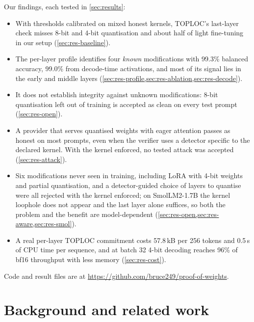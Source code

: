 \documentclass[11pt]{article}
\begin{document}
Our findings, each tested in \cref{sec:results}:
\begin{itemize}
  \item With thresholds calibrated on mixed honest kernels, TOPLOC's last-layer check misses 8-bit and 4-bit quantisation and about half of light fine-tuning in our setup (\cref{sec:res-baseline}).
  \item The per-layer profile identifies four \emph{known} modifications with 99.3\% balanced accuracy, 99.0\% from decode-time activations, and most of its signal lies in the early and middle layers (\cref{sec:res-profile,sec:res-ablation,sec:res-decode}).
  \item It does not establish integrity against unknown modifications: 8-bit quantisation left out of training is accepted as clean on every test prompt (\cref{sec:res-open}).
  \item A provider that serves quantised weights with eager attention passes as honest on most prompts, even when the verifier uses a detector specific to the declared kernel. With the kernel enforced, no tested attack was accepted (\cref{sec:res-attack}).
  \item Six modifications never seen in training, including LoRA with 4-bit weights and partial quantisation, and a detector-guided choice of layers to quantise were all rejected with the kernel enforced; on SmolLM2-1.7B the kernel loophole does not appear and the last layer alone suffices, so both the problem and the benefit are model-dependent (\cref{sec:res-open,sec:res-aware,sec:res-smol}).
  \item A real per-layer TOPLOC commitment costs 57.8\,kB per 256 tokens and 0.5\,s of CPU time per sequence, and at batch 32 4-bit decoding reaches 96\% of bf16 throughput with less memory (\cref{sec:res-cost}).
\end{itemize}
Code and result files are at \url{https://github.com/bruce249/proof-of-weights}.

\section{Background and related work}
\label{sec:related}
\end{document}
